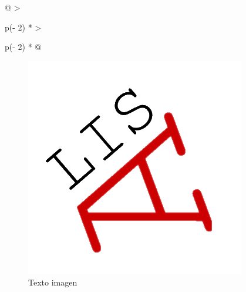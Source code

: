 \documentclass[
  letterpaper,
  DIV=11,
  numbers=noendperiod]{scrartcl}
\begin{document}
\begin{longtable}[]{@{}
  >{\raggedright\arraybackslash}p{(\columnwidth - 2\tabcolsep) * }
  >{\raggedright\arraybackslash}p{(\columnwidth - 2\tabcolsep) * }@{}}
\begin{minipage}[t]{\linewidth}
\begin{figure}[H]
{\centering \includegraphics{images/lisa_icon.png}

}

\caption{Texto imagen}


\end{figure}
\end{minipage}
\end{longtable}
\end{document}
